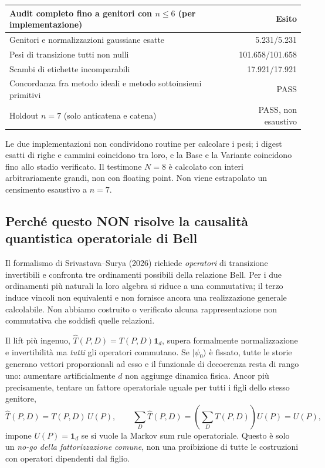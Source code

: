 \documentclass[11pt,a4paper]{article}
\begin{document}
\begin{center}
\small
\begin{tabular}{p{7.0cm}r}
\toprule
Audit completo fino a genitori con $n\le6$ (per implementazione) & Esito\\
\midrule
Genitori e normalizzazioni gaussiane esatte & 5.231/5.231\\
Pesi di transizione tutti non nulli & 101.658/101.658\\
Scambi di etichette incomparabili & 17.921/17.921\\
Concordanza fra metodo ideali e metodo sottoinsiemi primitivi & PASS\\
Holdout $n=7$ (solo anticatena e catena) & PASS, non esaustivo\\
\bottomrule
\end{tabular}
\end{center}
Le due implementazioni non condividono routine per calcolare i pesi; i digest esatti di righe e cammini coincidono tra loro, e la Base e la Variante coincidono fino allo stadio verificato. Il testimone $N=8$ \`e calcolato con interi arbitrariamente grandi, non con floating point. Non viene estrapolato un censimento esaustivo a $n=7$.

\clearpage
\subsection*{Perch\'e questo NON risolve la causalit\`a quantistica operatoriale di Bell}
Il formalismo di Srivastava--Surya (2026) richiede \emph{operatori} di transizione invertibili e confronta tre ordinamenti possibili della relazione Bell. Per i due ordinamenti pi\`u naturali la loro algebra si riduce a una commutativa; il terzo induce vincoli non equivalenti e non fornisce ancora una realizzazione generale calcolabile. Non abbiamo costruito o verificato alcuna rappresentazione non commutativa che soddisfi quelle relazioni.

Il lift pi\`u ingenuo, $\widehat T(P,D)=T(P,D)\mathbf 1_d$, supera formalmente normalizzazione e invertibilit\`a ma \emph{tutti} gli operatori commutano. Se $|\psi_0\rangle$ \`e fissato, tutte le storie generano vettori proporzionali ad esso e il funzionale di decoerenza resta di rango uno: aumentare artificialmente $d$ non aggiunge dinamica fisica. Ancor pi\`u precisamente, tentare un fattore operatoriale uguale per tutti i figli dello stesso genitore,
\begin{equation}
\widehat T(P,D)=T(P,D)\,U(P),\qquad
\sum_D\widehat T(P,D)=\left(\sum_DT(P,D)\right)U(P)=U(P),\tag{NS.11}
\end{equation}
impone $\boxed{U(P)=\mathbf 1_d}$ se si vuole la Markov sum rule operatoriale. Questo \`e solo un \emph{no-go della fattorizzazione comune}, non una proibizione di tutte le costruzioni con operatori dipendenti dal figlio.
\end{document}
